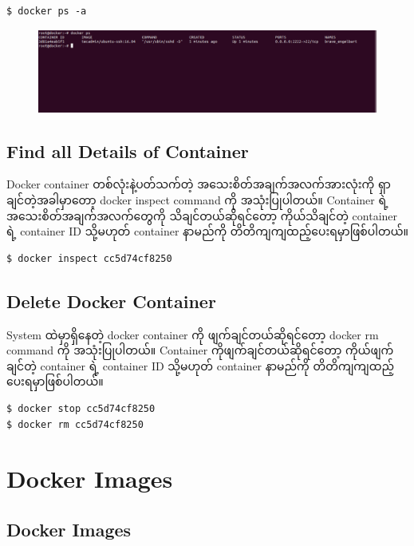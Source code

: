 \documentclass{article}
\begin{document}
\begin{verbatim}
$ docker ps -a
\end{verbatim}

\begin{figure}[htbp]
\centering
\includegraphics[width=0.70\paperwidth]{.gitbook/assets/4a_ps-large-resolution.png}
\end{figure}

\subsection{Find all Details of
Container}\label{find-all-details-of-container}

Docker container တစ်လုံးနဲ့ပတ်သက်တဲ့ အသေးစိတ်အချက်အလက်အားလုံးကို
ရှာချင်တဲ့အခါမှာတော့ docker inspect command ကို အသုံးပြုပါတယ်။ Container
ရဲ့ အသေးစိတ်အချက်အလက်တွေကို သိချင်တယ်ဆိုရင်တော့ ကိုယ်သိချင်တဲ့ container
ရဲ့ container ID သို့မဟုတ် container နာမည်ကို
တိတိကျကျထည့်ပေးရမှာဖြစ်ပါတယ်။

\begin{verbatim}
$ docker inspect cc5d74cf8250
\end{verbatim}

\subsection{Delete Docker Container}\label{delete-docker-container}

System ထဲမှာရှိနေတဲ့ docker container ကို ဖျက်ချင်တယ်ဆိုရင်တော့ docker
rm command ကို အသုံးပြုပါတယ်။ Container ကိုဖျက်ချင်တယ်ဆိုရင်တော့
ကိုယ်ဖျက်ချင်တဲ့ container ရဲ့ container ID သို့မဟုတ် container နာမည်ကို
တိတိကျကျထည့်ပေးရမှာဖြစ်ပါတယ်။

\begin{verbatim}
$ docker stop cc5d74cf8250
$ docker rm cc5d74cf8250
\end{verbatim}

\section{Docker Images}\label{docker-images}

\subsection{Docker Images}\label{docker-images-1}
\end{document}
